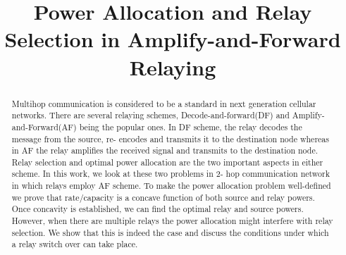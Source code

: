 \documentclass[conference]{IEEEtran}
\begin{document}
%
\title{Power Allocation and Relay Selection in
Amplify-and-Forward Relaying
}


\author{
}






\maketitle

\begin{abstract}
	Multihop communication is considered to be a standard in next generation
	cellular networks.  There are several relaying schemes,
	Decode-and-forward(DF) and Amplify-and-Forward(AF) being the popular ones.
	In DF scheme, the relay decodes the message from the source, re- encodes
	and transmits it to the destination node whereas in AF the relay amplifies
	the received signal and transmits to the destination node. Relay selection
	and optimal power allocation are the two important aspects in either
	scheme. In this work, we look at these two problems in 2- hop communication
	network in which relays employ AF scheme. To make the power allocation
	problem well-defined we prove that rate/capacity is a concave function of
	both source and relay powers. Once concavity is established, we can find
	the optimal relay and source powers. However, when there are multiple
	relays the power allocation might interfere with relay selection. We show
	that this is indeed the case and discuss the conditions under which a relay
	switch over can take place.

\end{abstract}
\end{document}
